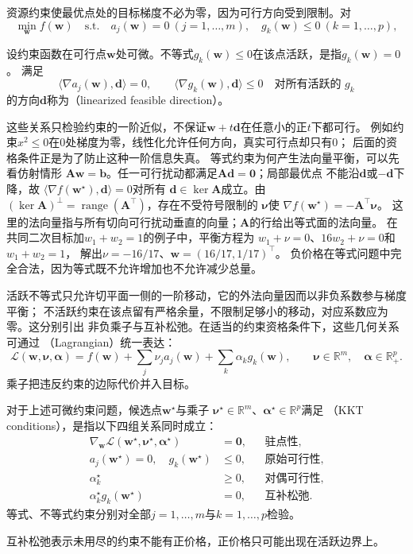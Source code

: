 资源约束使最优点处的目标梯度不必为零，因为可行方向受到限制。对
\[
  \min_{\bm{w}}f(\bm{w})
  \quad\text{s.t.}\quad
  a_j(\bm{w})=0\ (j=1,\ldots,m),\quad
  g_k(\bm{w})\leq0\ (k=1,\ldots,p),
\]
\begin{definition}[活跃约束与线性化可行方向]
\label{def:opt-linearized-feasible-direction}
设约束函数在可行点$\bm w$处可微。不等式$g_k(\bm w)\leq0$在该点活跃，是指$g_k(\bm w)=0$。
满足
\[
  \langle\nabla a_j(\bm{w}),\bm{d}\rangle=0,\qquad
  \langle\nabla g_k(\bm{w}),\bm{d}\rangle\leq0
  \quad\text{对所有活跃的 }g_k
\]
的方向$\bm{d}$称为（linearized feasible direction）。
\end{definition}
这些关系只检验约束的一阶近似，不保证$\bm w+t\bm d$在任意小的正$t$下都可行。
例如约束$x^2\leq0$在$0$处梯度为零，线性化允许任何方向，真实可行点却只有$0$；
后面的资格条件正是为了防止这种一阶信息失真。
等式约束为何产生法向量平衡，可以先看仿射情形
$\bm{A}\bm{w}=\bm{b}$。任一可行扰动都满足$\bm{A}\bm{d}=\bm{0}$；局部最优点
不能沿$\bm{d}$或$-\bm{d}$下降，故
$\langle\nabla f(\bm{w}^{\star}),\bm{d}\rangle=0$对所有
$\bm{d}\in\ker\bm{A}$成立。由
$(\ker\bm{A})^\perp=\operatorname{range}(\bm{A}^{\top})$，存在不受符号限制的
$\bm{\nu}$使
$\nabla f(\bm{w}^{\star})=-\bm{A}^{\top}\bm{\nu}$。
这里的法向量指与所有切向可行扰动垂直的向量；$\bm A$的行给出等式面的法向量。
在共同二次目标加$w_1+w_2=1$的例子中，平衡方程为
$w_1+\nu=0$、$16w_2+\nu=0$和$w_1+w_2=1$，
解出$\nu=-16/17$、$\bm w=(16/17,1/17)^\top$。
负价格在等式问题中完全合法，因为等式既不允许增加也不允许减少总量。

活跃不等式只允许切平面一侧的一阶移动，它的外法向量因而以非负系数参与梯度平衡；
不活跃约束在该点留有严格余量，不限制足够小的移动，对应系数应为零。这分别引出
非负乘子与互补松弛。在适当的约束资格条件下，这些几何关系可通过
（Lagrangian）统一表达：
\[
  \mathcal{L}(\bm{w},\bm{\nu},\bm{\alpha})
  =f(\bm{w})+\sum_j\nu_j a_j(\bm{w})
  +\sum_k\alpha_k g_k(\bm{w}),
  \qquad
  \bm{\nu}\in\mathbb{R}^m,\quad
  \bm{\alpha}\in\mathbb{R}_+^p.
\]
乘子把违反约束的边际代价并入目标。

\begin{definition}[KKT条件]
\label{def:opt-kkt-conditions}
对于上述可微约束问题，候选点$\bm w^\star$与乘子
$\bm\nu^\star\in\mathbb R^m$、$\bm\alpha^\star\in\mathbb R^p$满足
（KKT conditions），是指以下四组关系同时成立：
\begin{align}
  \nabla_{\bm{w}}\mathcal{L}(\bm{w}^{\star},\bm{\nu}^{\star},
  \bm{\alpha}^{\star})&=\bm{0},
  &&\text{驻点性},\label{eq:opt-kkt-stationarity}\\
  a_j(\bm{w}^{\star})=0,\quad g_k(\bm{w}^{\star})&\leq0,
  &&\text{原始可行性},\\
  \alpha_k^{\star}&\geq0,
  &&\text{对偶可行性},\\
  \alpha_k^{\star}g_k(\bm{w}^{\star})&=0,
  &&\text{互补松弛}.\label{eq:opt-kkt-complementarity}
\end{align}
等式、不等式约束分别对全部$j=1,\ldots,m$与$k=1,\ldots,p$检验。
\end{definition}
互补松弛表示未用尽的约束不能有正价格，正价格只可能出现在活跃边界上。

